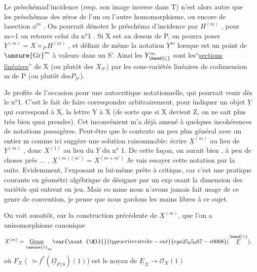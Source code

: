 
Le préschémad'incidence  (resp. son image inverse dans T) n'est alors
autre que les préschémas des zéros de l'un ou l'autre homomorphisme,
ou encore de lasection $\phi^{m}$ .  On pourrait dénoter le préschéma
d'incidence par $H^{(m)}$ , pour m=1 on retouve celui du n°1 .  Si X est
au dessus de P, on pourra poser $\underline{Y}^{(m)} = X\times_{P} \underline{H}^{(m)}$ ,  et définir de même
la notation $\underline{Y}^{m}$ lorsque \hand{$\zeta$} est un point de $\unsure{\mathrm{Gr}}^{m}$ à valeurs dans un S'.
Ainsi les  $Y^{m}_{\hand{\zeta}}$  sont les``\uline{sections} \uline{linéaires}''  de X  (ou plutôt des
$X_{S'}$)   par les sous-variétés linéaires de codimension m de P (ou
plutôt des$P_{S'}$).

Je profite de l'occasion pour une  autocritique notationnelle,
qui pourrait venir dès le n°1. C'est le fait  de faire correspondre
arbitrairement, pour indiquer un objet $\underline{Y}$ qui correspond à X, la lettre
Y à X  (de sorte que si X devient Z, on ne sait plus très bien quoi
prendre). Cet inconvénient m'a déjà amené à quelques incohérences de
notations passagères.  Peut-être que le contexte un peu plus général
avec un entier m comme ici suggère une solution raisonnnable: écrire
$\underline{X}^{(m)}$ au lieu de  $\underline{Y}^{(m)}$ , donc  $\underline{X}^{(1)}$ au lieu du  $\underline{Y}$  du n° 1. De cette
façon, on  aurait bien , à peu de choses près ... ,  $\underline{X}^{(m)(m')} = X^{(m+m')}$
Je vais essayer cette notation par la suite.  Evidemment, l'exposant m
lui-même prête à critique, car  c'est une pratique courante en géométri
algébrique de désigner par un exp osant la dimension des variétés qui
entrent en jeu. Mais co mme nous n'avons jamais fait usage de ce genre
de convention, je pense que nous gardons les mains libres à ce sujet.

On voit aussitôt, sur la construction précédente de $\underline{X}^{(m)}$, que
l'on a unisomorphisme canonique
\[ X^{(m)} = \underset{\unsure{1}}{\underline{\mathrm{Grass}}}_{m}\var{\xout{\$}}{}{typewriter strike-out}{ega25_25_067-v0008}(\overset{\hand{\vee}}{\underline{F}}) , \]
où  $F_{X}$  ( $\simeq f^{*}(\underline{\Omega}_{P/S})(1)$)   est le noyau de  $\underline{E}_{X} \longrightarrow \mathcal{O}_{X}(1)$\hand{,}

